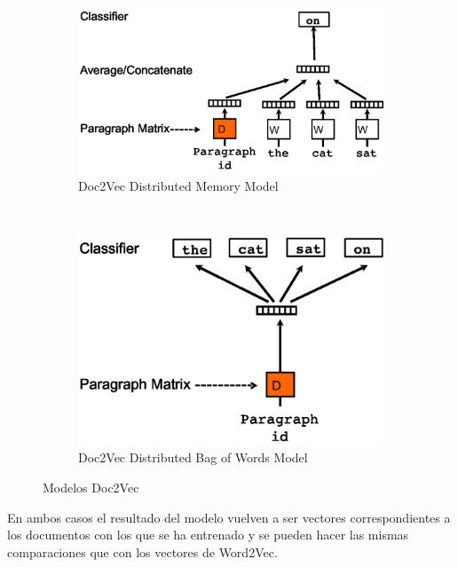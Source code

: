 \documentclass[withindex, glossary]{cam-thesis}
\begin{document}
\begin{figure}[!htbp]
    \centering
    \begin{subfigure}[t]{0.4\textwidth}
        \centering
        \includegraphics[width=\textwidth]{./figures/distributed_memory_model.pdf}
        \caption{Doc2Vec Distributed Memory Model}\label{d2v-dmm}
    \end{subfigure}
    ~
    \begin{subfigure}[t]{0.4\textwidth}
        \centering
        \includegraphics[width=\textwidth]{./figures/distributed_bag_of_words.pdf}
        \caption{Doc2Vec Distributed Bag of Words Model}\label{d2v-dbow}
    \end{subfigure}
    \caption{Modelos Doc2Vec}
\end{figure}

En ambos casos el resultado del modelo vuelven a ser vectores correspondientes a los documentos con los que se ha entrenado y se pueden hacer las mismas comparaciones que con los vectores de Word2Vec.
\end{document}

